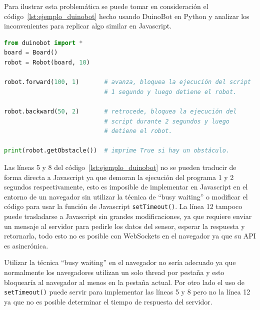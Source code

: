 Para ilustrar esta problemática se puede tomar en consideración el
código~\ref{lst:ejemplo_duinobot}
hecho usando DuinoBot en Python y analizar los inconvenientes para replicar
algo similar en Javascript.

\begin{lstlisting}[language=Python,
caption={Ejemplo típico usando DuinoBot},label=lst:ejemplo_duinobot]
from duinobot import *
board = Board()
robot = Robot(board, 10)

robot.forward(100, 1)       # avanza, bloquea la ejecución del script
                            # 1 segundo y luego detiene el robot.

robot.backward(50, 2)       # retrocede, bloquea la ejecución del
                            # script durante 2 segundos y luego
                            # detiene el robot.

print(robot.getObstacle())  # imprime True si hay un obstáculo.
\end{lstlisting}


Las líneas 5 y 8 del código~\ref{lst:ejemplo_duinobot}
no se pueden traducir de forma directa
a Javascript ya que demoran la ejecución del programa
1 y 2 segundos respectivamente, esto es imposible de implementar en
Javascript en el entorno de un navegador sin utilizar la técnica de ``busy
waiting'' o modificar el código para usar la función de Javascript
\texttt{setTimeout()}. La línea 12 tampoco puede trasladarse a Javascript
sin grandes modificaciones, ya que requiere enviar un mensaje al servidor
para pedirle los datos del sensor, esperar la respuesta y retornarla, todo
esto no es posible con WebSockets en el navegador ya que su API es asincrónica.

Utilizar la técnica ``busy waiting'' en el navegador no sería adecuado ya que
normalmente los navegadores utilizan un solo thread por pestaña y esto
bloquearía al navegador al menos en la pestaña actual. Por otro lado
el uso de \texttt{setTimeout()} puede servir para implementar las líneas
5 y 8 pero no la línea 12 ya que no es posible determinar el tiempo
de respuesta del servidor.

